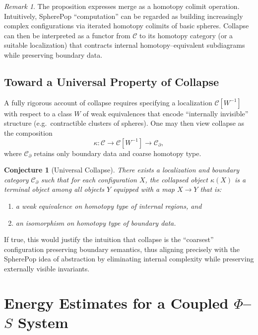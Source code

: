 \documentclass[12pt]{article}
\theoremstyle{plain}
\newtheorem{conjecture_env}[theorem]{Conjecture}
\theoremstyle{definition}
\theoremstyle{remark}
\newtheorem{remark}[theorem]{Remark}
\begin{document}
\begin{remark}
The proposition expresses merge as a homotopy colimit operation. Intuitively,
SpherePop ``computation'' can be regarded as building increasingly complex
configurations via iterated homotopy colimits of basic spheres. Collapse can
then be interpreted as a functor from $\mathcal{C}$ to its homotopy category
(or a suitable localization) that contracts internal homotopy--equivalent
subdiagrams while preserving boundary data.
\end{remark}

\subsection{Toward a Universal Property of Collapse}

A fully rigorous account of collapse requires specifying a localization
$\mathcal{C}[W^{-1}]$ with respect to a class $W$ of weak equivalences that
encode ``internally invisible'' structure (e.g.\ contractible clusters of
spheres). One may then view collapse as the composition
\[
    \kappa : \mathcal{C}
    \longrightarrow \mathcal{C}[W^{-1}]
    \longrightarrow \mathcal{C}_{\partial},
\]
where $\mathcal{C}_{\partial}$ retains only boundary data and coarse
homotopy type.

\begin{conjecture_env}[Universal Collapse]
There exists a localization and boundary category $\mathcal{C}_\partial$ such
that for each configuration $X$, the collapsed object $\kappa(X)$ is a terminal
object among all objects $Y$ equipped with a map $X\to Y$ that is:
\begin{enumerate}
    \item a weak equivalence on homotopy type of internal regions, and
    \item an isomorphism on homotopy type of boundary data.
\end{enumerate}
\end{conjecture_env}

If true, this would justify the intuition that collapse is the ``coarsest''
configuration preserving boundary semantics, thus aligning precisely with the
SpherePop idea of abstraction by eliminating internal complexity while preserving
externally visible invariants.

\newpage

\section{Energy Estimates for a Coupled $\Phi$--$S$ System}
\end{document}
